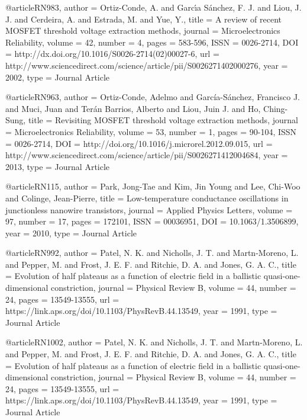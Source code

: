 @article{RN983,
   author = {Ortiz-Conde, A. and Garcı́a Sánchez, F. J. and Liou, J. J. and Cerdeira, A. and Estrada, M. and Yue, Y.},
   title = {A review of recent MOSFET threshold voltage extraction methods},
   journal = {Microelectronics Reliability},
   volume = {42},
   number = {4},
   pages = {583-596},
   ISSN = {0026-2714},
   DOI = {http://dx.doi.org/10.1016/S0026-2714(02)00027-6},
   url = {http://www.sciencedirect.com/science/article/pii/S0026271402000276},
   year = {2002},
   type = {Journal Article}
}

@article{RN963,
   author = {Ortiz-Conde, Adelmo and García-Sánchez, Francisco J. and Muci, Juan and Terán Barrios, Alberto and Liou, Juin J. and Ho, Ching-Sung},
   title = {Revisiting MOSFET threshold voltage extraction methods},
   journal = {Microelectronics Reliability},
   volume = {53},
   number = {1},
   pages = {90-104},
   ISSN = {0026-2714},
   DOI = {http://doi.org/10.1016/j.microrel.2012.09.015},
   url = {http://www.sciencedirect.com/science/article/pii/S0026271412004684},
   year = {2013},
   type = {Journal Article}
}

@article{RN115,
   author = {Park, Jong-Tae and Kim, Jin Young and Lee, Chi-Woo and Colinge, Jean-Pierre},
   title = {Low-temperature conductance oscillations in junctionless nanowire transistors},
   journal = {Applied Physics Letters},
   volume = {97},
   number = {17},
   pages = {172101},
   ISSN = {00036951},
   DOI = {10.1063/1.3506899},
   year = {2010},
   type = {Journal Article}
}

@article{RN992,
   author = {Patel, N. K. and Nicholls, J. T. and Martn-Moreno, L. and Pepper, M. and Frost, J. E. F. and Ritchie, D. A. and Jones, G. A. C.},
   title = {Evolution of half plateaus as a function of electric field in a ballistic quasi-one-dimensional constriction},
   journal = {Physical Review B},
   volume = {44},
   number = {24},
   pages = {13549-13555},
   url = {https://link.aps.org/doi/10.1103/PhysRevB.44.13549},
   year = {1991},
   type = {Journal Article}
}

@article{RN1002,
   author = {Patel, N. K. and Nicholls, J. T. and Martn-Moreno, L. and Pepper, M. and Frost, J. E. F. and Ritchie, D. A. and Jones, G. A. C.},
   title = {Evolution of half plateaus as a function of electric field in a ballistic quasi-one-dimensional constriction},
   journal = {Physical Review B},
   volume = {44},
   number = {24},
   pages = {13549-13555},
   url = {https://link.aps.org/doi/10.1103/PhysRevB.44.13549},
   year = {1991},
   type = {Journal Article}
}

